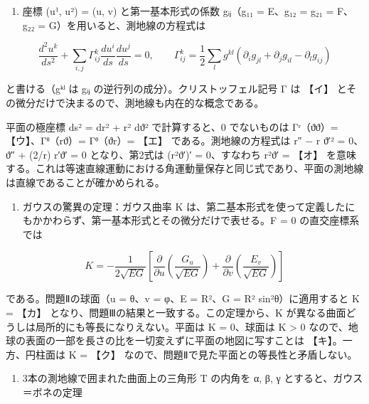 \documentclass[
  10pt,
  a4paper,
]{article}
\providecommand{\tightlist}{%
  \setlength{\itemsep}{0pt}\setlength{\parskip}{0pt}}
\begin{document}
\begin{enumerate}
\def\labelenumi{(\arabic{enumi})}
\setcounter{enumi}{1}
\tightlist
\item
  座標 (u¹, u²) = (u, v) と第一基本形式の係数
  g{\fallbackfont ᵢⱼ}（g{\fallbackfont ₁₁} = E、g{\fallbackfont ₁₂} =
  g{\fallbackfont ₂₁} = F、g{\fallbackfont ₂₂} =
  G）を用いると、測地線の方程式は
\end{enumerate}

\[\frac{d^2u^k}{ds^2} + \sum_{i,j} \Gamma^k_{ij} \frac{du^i}{ds} \frac{du^j}{ds} = 0, \qquad \Gamma^k_{ij} = \frac{1}{2} \sum_{l} g^{kl} \left( \partial_i g_{jl} + \partial_j g_{il} - \partial_l g_{ij} \right)\]

と書ける（g{\fallbackfont ᵏˡ} は g{\fallbackfont ᵢⱼ}
の逆行列の成分）。クリストッフェル記号 Γ は 【イ】
とその微分だけで決まるので、測地線も内在的な概念である。

平面の極座標 ds² = dr² + r² d{\fallbackfont ϑ}² で計算すると、0
でないものは Γ{\fallbackfont ʳ}（{\fallbackfont ϑϑ}）=
【ウ】、Γ{\fallbackfont ᶿ}（r{\fallbackfont ϑ}）=
Γ{\fallbackfont ᶿ}（{\fallbackfont ϑ}r）= 【エ】
である。測地線の方程式は r″ − r {\fallbackfont ϑ}′² =
0、{\fallbackfont ϑ}″ + (2/r) r′{\fallbackfont ϑ}′ = 0 となり、第2式は
(r²{\fallbackfont ϑ}′)′ = 0、すなわち r²{\fallbackfont ϑ}′ = 【オ】
を意味する。これは等速直線運動における角運動量保存と同じ式であり、平面の測地線は直線であることが確かめられる。

\begin{enumerate}
\def\labelenumi{(\arabic{enumi})}
\setcounter{enumi}{2}
\tightlist
\item
  ガウスの驚異の定理：ガウス曲率 K
  は、第二基本形式を使って定義したにもかかわらず、第一基本形式とその微分だけで表せる。F
  = 0 の直交座標系では
\end{enumerate}

\[K = -\frac{1}{2\sqrt{EG}} \left[ \frac{\partial}{\partial u}\left( \frac{G_u}{\sqrt{EG}} \right) + \frac{\partial}{\partial v}\left( \frac{E_v}{\sqrt{EG}} \right) \right]\]

である。問題Ⅱの球面（u = θ、v = φ、E = R²、G = R² sin²θ）に適用すると K
= 【カ】 となり、問題Ⅲの結果と一致する。この定理から、K
が異なる曲面どうしは局所的にも等長になりえない。平面は K = 0、球面は K
\textgreater{} 0
なので、地球の表面の一部を長さの比を一切変えずに平面の地図に写すことは
【キ】。一方、円柱面は K = 【ク】
なので、問題Ⅱで見た平面との等長性と矛盾しない。

\begin{enumerate}
\def\labelenumi{(\arabic{enumi})}
\setcounter{enumi}{3}
\tightlist
\item
  3本の測地線で囲まれた曲面上の三角形 T の内角を α, β, γ
  とすると、ガウス＝ボネの定理
\end{enumerate}
\end{document}
